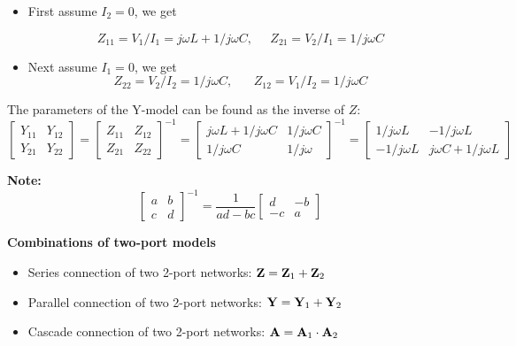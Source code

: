 \documentclass{article}
\begin{document}
\begin{itemize}
\item First assume $I_2=0$, we get

  \begin{equation}
    Z_{11}=V_1/I_1=j\omega L+1/j\omega C,\;\;\;\;\;Z_{21}=V_2/I_1=1/j\omega C 
  \end{equation}
\item Next assume $I_1=0$, we get
  \begin{equation}
    Z_{22}=V_2/I_2=1/j\omega C,\;\;\;\;\;\;Z_{12}=V_1/I_2=1/j\omega C 
  \end{equation}
\end{itemize}
The parameters of the Y-model can be found as the inverse of $Z$:
\begin{equation}
  \left[\begin{array}{cc}Y_{11}&Y_{12}\\Y_{21}&Y_{22}\end{array}\right]
  =\left[\begin{array}{cc}Z_{11}&Z_{12}\\Z_{21}&Z_{22}\end{array}\right]^{-1}
  =\left[\begin{array}{cc}j\omega L+1/j\omega C & 1/j\omega C\\
      1/j\omega C & 1/j\omega \end{array}\right]^{-1}
  =\left[\begin{array}{cc}1/j\omega L & -1/j\omega L\\
      -1/j\omega L & j\omega C+1/j\omega L\end{array}\right] 
\end{equation}
	
{\bf Note:} 
\begin{equation}
  \left[ \begin{array}{rr} a & b \\ c & d \end{array} \right]^{-1}
  =\frac{1}{ad-bc}\left[ \begin{array}{rr} d & -b \\ -c & a \end{array} \right]
\end{equation}

{\bf Combinations of two-port models}

\begin{itemize}
\item Series connection of two 2-port networks: 
	${\bf Z}={\bf Z}_1+{\bf Z}_2$
\item Parallel connection of two 2-port networks: 
	${\bf Y}={\bf Y}_1+{\bf Y}_2$
\item Cascade connection of two 2-port networks:
	${\bf A}={\bf A}_1 \cdot {\bf A}_2$
\end{itemize}
\end{document}

